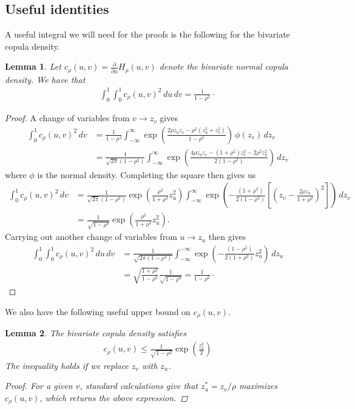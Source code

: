 \documentclass[11pt,a4paper]{article}
\newtheorem{lem}{Lemma}
\begin{document}
\begin{appendices}
\subsection{Useful identities}
A useful integral we will need for the proofs is the following for the bivariate copula density.
\begin{lem}\label{app:lem_cop_squared}
    Let $c_\rho(u,v) = \frac{\partial}{\partial u} H_\rho(u,v)$ denote the bivariate normal copula density. We have that
    \begin{align*}
        \int_0^1\int_0^1 c_\rho(u,v)^2 \, du \, dv = \frac{1}{1-\rho^2}\cdot
    \end{align*}
\end{lem}
\begin{proof}
     A change of variables from $v \to z_v$ gives
    \begin{align*}
        \int_0^1 c_\rho(u,v)^2\, dv &= \frac{1}{{1-\rho^2}}\int_{-\infty}^\infty \exp\left(\frac{2\rho z_u z_v - \rho^2(z_u^2 + z_v^2)}{1-\rho^2}\right) \, \phi(z_v)\, dz_v\\
        &=\frac{1}{\sqrt{2\pi}{(1-\rho^2)}}\int_{-\infty}^\infty \exp\left(\frac{4\rho z_u z_v-(1+\rho^2)z_v^2 - 2\rho^2z_u^2 }{2(1-\rho^2)}\right) \, dz_v
    \end{align*}
    where $\phi$ is the normal density. Completing the square then gives us
    \begin{align*}
\int_0^1 c_\rho(u,v)^2\, dv &=\frac{1}{\sqrt{2\pi}(1-\rho^2)}\exp\left(\frac{\rho^2}{1+\rho^2}z_u^2\right)\int_{-\infty}^\infty \exp\left(-\frac{(1+\rho^2)}{2(1-\rho^2)}\left[\left(z_v - \frac{2\rho z_u}{1+\rho^2}\right)^2\right]\right) \, dz_v \\
&=\frac{1}{\sqrt{1-\rho^4}}\exp\left(\frac{\rho^2}{1+\rho^2}z_u^2\right).
    \end{align*}
    Carrying out another change of variables from $u \to z_u$ then gives
    \begin{align*}
        \int_0^1\int_0^1 c_\rho(u,v)^2\, du\, dv &= \frac{1}{\sqrt{2\pi(1-\rho^4)}}\int_{-\infty}^{-\infty}\exp\left(-\frac{(1-\rho^2)}{2(1+\rho^2)}z_u^2\right)\, dz_u\\
        &=\sqrt{\frac{1+\rho^2}{1-\rho^2}}\frac{1}{\sqrt{1-\rho^4}} = \frac{1}{1-\rho^2}\cdot
    \end{align*}
\end{proof}
We also have the following useful upper bound on $c_\rho(u,v)$.
\begin{lem}\label{app:lem_cop_bounded}
    The bivariate copula density satisfies
    \begin{align*}
        c_\rho(u,v) \leq \frac{1}{\sqrt{1-\rho^2}}\exp\left(\frac{z_v^2}{2}\right)
    \end{align*}
   The inequality holds if we replace $z_v$ with $z_u$.
    \begin{proof}
      For a given $v$, standard calculations give that  $z_u^* = z_v/\rho$ maximizes $c_\rho(u,v)$, which returns the above expression.
    \end{proof}
\end{lem}



\end{appendices}
\end{document}
